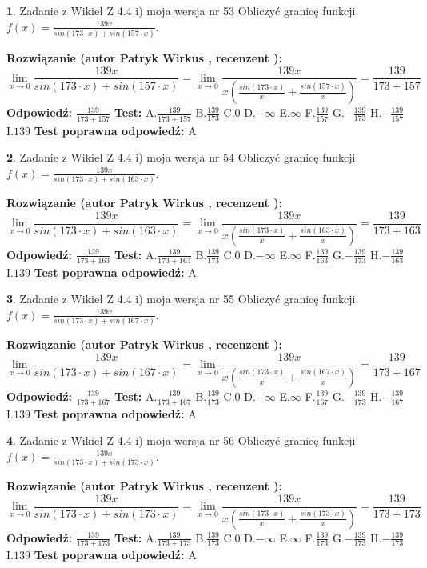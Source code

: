 \documentclass[12pt, a4paper]{article}
\theoremstyle{definition} %
\newtheorem{zad}{}
\newcommand{\zadStart}[1]{\begin{zad}#1\newline}
\newcommand{\zadStop}{\end{zad}}
\newcommand{\rozwStart}[2]{\noindent \textbf{Rozwiązanie (autor #1 , recenzent #2): }\newline}
\newcommand{\rozwStop}{\newline}
\newcommand{\odpStart}{\noindent \textbf{Odpowiedź:}\newline}
\newcommand{\odpStop}{\newline}
\newcommand{\testStart}{\noindent \textbf{Test:}\newline}
\newcommand{\testStop}{\newline}
\newcommand{\kluczStart}{\noindent \textbf{Test poprawna odpowiedź:}\newline}
\newcommand{\kluczStop}{\newline}
\begin{document}
\zadStart{Zadanie z Wikieł Z 4.4 i) moja wersja nr 53}
Obliczyć granicę funkcji $f(x)=\frac{139x}{sin(173\cdot x) +sin(157\cdot x)}$.
\zadStop
\rozwStart{Patryk Wirkus}{}
$$\lim\limits_{x\to 0}\frac{139x}{sin(173\cdot x) +sin(157\cdot x)}=\lim\limits_{x\to 0}\frac{139x}{x(\frac{sin(173\cdot x)}{x}+\frac{sin(157\cdot x)}{x})}=\frac{139}{173+157}$$
\rozwStop
\odpStart
$\frac{139}{173+157}$
\odpStop
\testStart
A.$\frac{139}{173+157}$
B.$\frac{139}{173}$
C.$0$
D.$-\infty$
E.$\infty$
F.$\frac{139}{157}$
G.$-\frac{139}{173}$
H.$-\frac{139}{157}$
I.$139$
\testStop
\kluczStart
A
\kluczStop



\zadStart{Zadanie z Wikieł Z 4.4 i) moja wersja nr 54}
Obliczyć granicę funkcji $f(x)=\frac{139x}{sin(173\cdot x) +sin(163\cdot x)}$.
\zadStop
\rozwStart{Patryk Wirkus}{}
$$\lim\limits_{x\to 0}\frac{139x}{sin(173\cdot x) +sin(163\cdot x)}=\lim\limits_{x\to 0}\frac{139x}{x(\frac{sin(173\cdot x)}{x}+\frac{sin(163\cdot x)}{x})}=\frac{139}{173+163}$$
\rozwStop
\odpStart
$\frac{139}{173+163}$
\odpStop
\testStart
A.$\frac{139}{173+163}$
B.$\frac{139}{173}$
C.$0$
D.$-\infty$
E.$\infty$
F.$\frac{139}{163}$
G.$-\frac{139}{173}$
H.$-\frac{139}{163}$
I.$139$
\testStop
\kluczStart
A
\kluczStop



\zadStart{Zadanie z Wikieł Z 4.4 i) moja wersja nr 55}
Obliczyć granicę funkcji $f(x)=\frac{139x}{sin(173\cdot x) +sin(167\cdot x)}$.
\zadStop
\rozwStart{Patryk Wirkus}{}
$$\lim\limits_{x\to 0}\frac{139x}{sin(173\cdot x) +sin(167\cdot x)}=\lim\limits_{x\to 0}\frac{139x}{x(\frac{sin(173\cdot x)}{x}+\frac{sin(167\cdot x)}{x})}=\frac{139}{173+167}$$
\rozwStop
\odpStart
$\frac{139}{173+167}$
\odpStop
\testStart
A.$\frac{139}{173+167}$
B.$\frac{139}{173}$
C.$0$
D.$-\infty$
E.$\infty$
F.$\frac{139}{167}$
G.$-\frac{139}{173}$
H.$-\frac{139}{167}$
I.$139$
\testStop
\kluczStart
A
\kluczStop



\zadStart{Zadanie z Wikieł Z 4.4 i) moja wersja nr 56}
Obliczyć granicę funkcji $f(x)=\frac{139x}{sin(173\cdot x) +sin(173\cdot x)}$.
\zadStop
\rozwStart{Patryk Wirkus}{}
$$\lim\limits_{x\to 0}\frac{139x}{sin(173\cdot x) +sin(173\cdot x)}=\lim\limits_{x\to 0}\frac{139x}{x(\frac{sin(173\cdot x)}{x}+\frac{sin(173\cdot x)}{x})}=\frac{139}{173+173}$$
\rozwStop
\odpStart
$\frac{139}{173+173}$
\odpStop
\testStart
A.$\frac{139}{173+173}$
B.$\frac{139}{173}$
C.$0$
D.$-\infty$
E.$\infty$
F.$\frac{139}{173}$
G.$-\frac{139}{173}$
H.$-\frac{139}{173}$
I.$139$
\testStop
\kluczStart
A
\kluczStop
\end{document}
